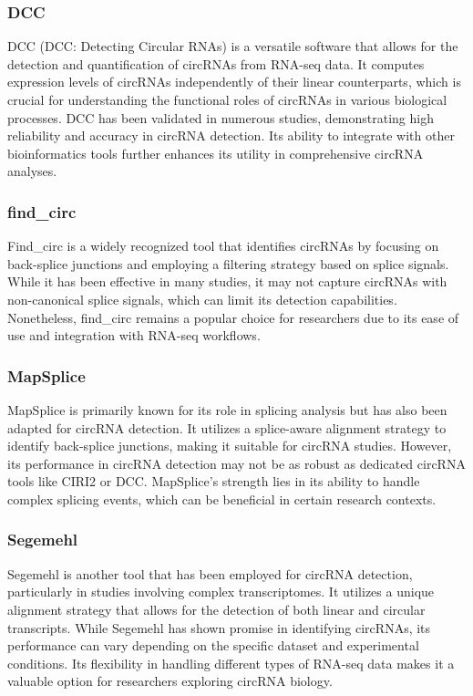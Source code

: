 \subsubsection{DCC}
DCC (DCC: Detecting Circular RNAs) is a versatile software that allows for the
detection and quantification of circRNAs from RNA-seq data.
It computes expression levels of circRNAs independently of their linear
counterparts, which is crucial for understanding the functional roles of
circRNAs in various biological
processes\supercite{jakobi_profiling_2016,man_profiling_2020}.
DCC has been validated in numerous studies, demonstrating high reliability and
accuracy in circRNA detection\supercite{paraboschi_interpreting_2018}.
Its ability to integrate with other bioinformatics tools further enhances its
utility in comprehensive circRNA analyses.

\subsubsection{find\_circ}
Find\_circ is a widely recognized tool that identifies circRNAs by focusing on
back-splice junctions and employing a filtering strategy based on splice
signals.
While it has been effective in many studies, it may not capture circRNAs with
non-canonical splice signals, which can limit its detection
capabilities\supercite{sekar_circular_2018,liu_prkra_2022}.
Nonetheless, find\_circ remains a popular choice for researchers due to its
ease of use and integration with RNA-seq workflows.

\subsubsection{MapSplice}
MapSplice is primarily known for its role in splicing analysis but has also
been adapted for circRNA detection.
It utilizes a splice-aware alignment strategy to identify back-splice
junctions, making it suitable for circRNA studies.
However, its performance in circRNA detection may not be as robust as dedicated
circRNA tools like CIRI2 or
DCC\supercite{zeng_comprehensive_2017,chuang_nclscan_2016}.
MapSplice's strength lies in its ability to handle complex splicing events,
which can be beneficial in certain research contexts.

\subsubsection{Segemehl}
Segemehl is another tool that has been employed for circRNA detection,
particularly in studies involving complex transcriptomes.
It utilizes a unique alignment strategy that allows for the detection of both
linear and circular transcripts.
While Segemehl has shown promise in identifying circRNAs, its performance can
vary depending on the specific dataset and experimental
conditions\supercite{gao_ciri_2015,zeng_comprehensive_2017}.
Its flexibility in handling different types of RNA-seq data makes it a valuable
option for researchers exploring circRNA biology.